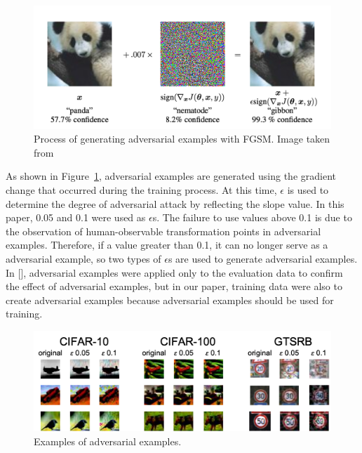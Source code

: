 \documentclass[journal,article,submit,moreauthors,pdftex]{Definitions/mdpi}
\begin{document}
\begin{figure}[H] 
\includegraphics[width=13cm]{Definitions/fgsm.png}
\caption{Process of generating adversarial examples with FGSM. Image taken from \cite{fgsm-method}\label{fgsm}}
\end{figure} 

As shown in Figure~\ref{fgsm}, adversarial examples are generated using the gradient change that occurred during the training process.
At this time, \begin{math}\epsilon\end{math} is used to determine the degree of adversarial attack by reflecting the slope value.
In this paper, 0.05 and 0.1 were used as \begin{math}\epsilon\end{math}s. The failure to use values above 0.1 is due to the observation of human-observable transformation points in adversarial examples.
Therefore, if a value greater than 0.1, it can no longer serve as a adversarial example, so two types of \begin{math}\epsilon\end{math}s are used to generate adversarial examples.
In [], adversarial examples were applied only to the evaluation data to confirm the effect of adversarial examples, but in our paper, training data were also to create adversarial examples because adversarial examples should be used for training.

\begin{figure}[H]
\includegraphics[width=13 cm]{Definitions/adversarial-dataset.png}
\caption{Examples of adversarial examples.\label{adversarial-examples}}
\end{figure} 
\end{document}
